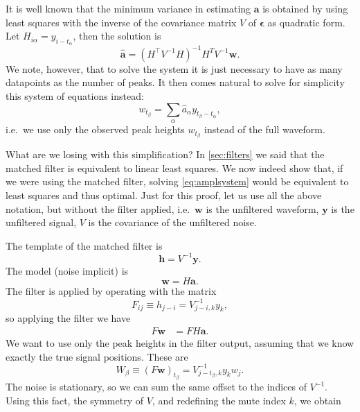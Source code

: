 It is well known that the minimum variance in estimating $\mathbf a$ is
obtained by using least squares with the inverse of the covariance matrix $V$
of $\boldsymbol\epsilon$ as quadratic form. Let $H_{i\alpha} = y_{i-t_\alpha}$,
then the solution is \cite[628]{zyla2020}
%
\begin{equation}
    \hat{\mathbf a} = (H^\top V^{-1} H)^{-1} H^T V^{-1} \mathbf w.
    \label{eq:lsq}
\end{equation}
%
We note, however, that to solve the system it is just necessary to have as many
datapoints as the number of peaks. It then comes natural to solve for
simplicity this system of equations instead:
%
\begin{equation}
    w_{t_\beta} = \sum_\alpha \hat a_\alpha y_{t_\beta - t_\alpha},
    \label{eq:amplsystem}
\end{equation}
%
i.e.\ we use only the observed peak heights $w_{t_\beta}$ instead of the full
waveform.

What are we losing with this simplification? In \autoref{sec:filters} we said
that the matched filter is equivalent to linear least squares. We now indeed
show that, if we were using the matched filter, solving \eqref{eq:amplsystem}
would be equivalent to least squares and thus optimal. Just for this proof, let
us use all the above notation, but without the filter applied, i.e.\ $\mathbf
w$ is the unfiltered waveform, $\mathbf y$ is the unfiltered signal, $V$ is the
covariance of the unfiltered noise.

The template of the matched filter is
%
\begin{equation}
    \mathbf h = V^{-1} \mathbf y.
\end{equation}
%
The model (noise implicit) is
%
\begin{equation}
    \mathbf w = H \mathbf a.
\end{equation}
%
The filter is applied by operating with the matrix
\begin{equation}
    F_{ij} \equiv h_{j-i} = V^{-1}_{j-i,k} y_k,
\end{equation}
%
so applying the filter we have
%
\begin{align}
    F \mathbf w &= F H \mathbf a. \label{eq:noindices}
\end{align}
%
We want to use only the peak heights in the filter output, assuming that we
know exactly the true signal positions. These are
%
\begin{equation}
    W_\beta \equiv (F \mathbf w)_{t_\beta} = V^{-1}_{j-t_\beta,k} y_k w_j. 
\end{equation}
%
The noise is stationary, so we can sum the same offset to the indices of
$V^{-1}$. Using this fact, the symmetry of $V$, and redefining the mute index
$k$, we obtain

